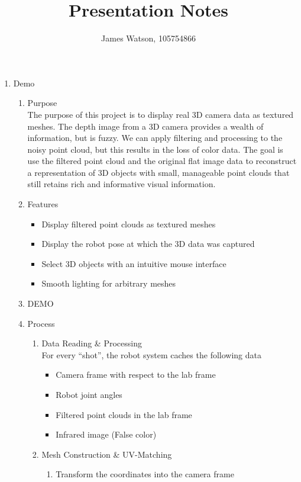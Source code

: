 \documentclass{hw_grad}
\title{Presentation Notes}
\institute{University of Colorado Boulder}
\author{James Watson, 105754866}
\begin{document}
	\maketitle
	
	\begin{enumerate}
		\item Demo
		\begin{enumerate}
			\item Purpose\\
			The purpose of this project is to display real 3D camera data as textured meshes.  The depth image from a 3D camera provides a wealth of information, but is fuzzy.  We can apply filtering and processing to the noisy point cloud, but this results in the loss of color data.  The goal is use the filtered point cloud and the original flat image data to reconstruct a representation of 3D objects with small, manageable point clouds that still retains rich and informative visual information. 
			\item Features
			\begin{itemize}
				\item Display filtered point clouds as textured meshes
				\item Display the robot pose at which the 3D data was captured
				\item Select 3D objects with an intuitive mouse interface
				\item Smooth lighting for arbitrary meshes
			\end{itemize}
			\item DEMO
			\item Process
			\begin{enumerate}
				\item Data Reading \& Processing \\
				For every ``shot'', the robot system caches the following data
				\begin{itemize}
					\item Camera frame with respect to the lab frame
					\item Robot joint angles
					\item Filtered point clouds in the lab frame
					\item Infrared image (False color)
				\end{itemize}
				\item Mesh Construction \& UV-Matching
				\begin{enumerate}
					\item Transform the coordinates into the camera frame

\end{enumerate}
\end{enumerate}
\end{enumerate}
\end{enumerate}
\end{document}
